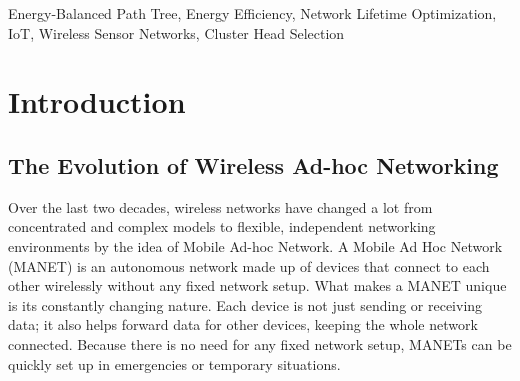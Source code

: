 \documentclass[conference]{IEEEtran}
\begin{document}
\begin{abstract}
Abstract— In modern Internet of Things (IoT) systems, Wireless Sensor Networks (WSNs) plays a critical role, but their lifetime is often limited by the Energy Hole problem. Nodes located near the Base Station (BS) handle most of the data forwarding and therefore drain their energy quickly, which can cause the network to break apart. Old routing protocols such as LEACH, HEED, and PEGASIS try to reduce this issue using random rotation or chain-based structures. However, these methods achieve only about 10–15\% of the network’s theoretical maximum lifetime. Vanguard-WSN, proposed framework replaces random decision-making with a utility-based deterministic approach. The framework includes two key innovations namely a Composite Utility Index (Ui) to select Cluster Heads based on remaining energy and network position, and an Energy-Balanced Path Tree (EBPT) with an adaptive load-balancing factor to prevent energy hotspots. Simulation results from 30 trials on a 100node network show that Vanguard-WSN is better than older systems. The First Node Death (FND) occurs at round 993.1, compared to LEACH (FND = 97.3). Vanguard achieves 92\% of the theoretical lifetime bound ($R^2=0.94$), maintains a Packet Success Ratio of 98.4\%, and operates within $O(NlogN)$ time complexity, making it suitable for low-power microcontrollers. These results show that Vanguard-WSN provides a highly efficient and practical solution for mission-critical WSN applications.
\end{abstract}

\begin{IEEEkeywords}
Energy-Balanced Path Tree, Energy Efficiency, Network Lifetime Optimization, IoT, Wireless Sensor Networks, Cluster Head Selection
\end{IEEEkeywords}

\section{Introduction}

\subsection{The Evolution of Wireless Ad-hoc Networking}
Over the last two decades, wireless networks have changed a lot from concentrated and complex models to flexible, independent networking environments by the idea of Mobile Ad-hoc Network. A Mobile Ad Hoc Network (MANET) is an autonomous network made up of devices that connect to each other wirelessly without any fixed network setup. What makes a MANET unique is its constantly changing nature. Each device is not just sending or receiving data; it also helps forward data for other devices, keeping the whole network connected. Because there is no need for any fixed network setup, MANETs can be quickly set up in emergencies or temporary situations.
\end{document}
